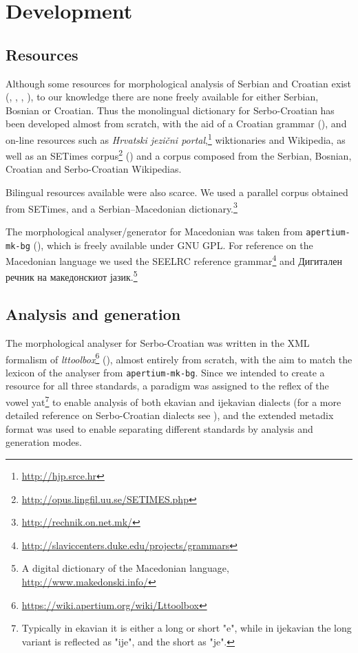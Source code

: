 \documentclass{book}
\begin{document}
\section{Development}
\subsection*{Resources}
Although some resources for morphological analysis of Serbian and Croatian exist
(\citealp{vitas2004intex}, \citealp{vitas2003processing}, \citealp{agic2008improving}, \citealp{snajder08automatic}), 
to our knowledge there are none freely available for either Serbian, Bosnian or 
Croatian. Thus the monolingual dictionary for Serbo-Croatian has been developed 
almost from scratch, with the aid of a Croatian grammar (\citealp{baric1997hrvatska}), 
and on-line resources such as \emph{Hrvatski jezični portal},\footnote{\url{http://hjp.srce.hr}}
wiktionaries and Wikipedia, as well as an SETimes corpus\footnote{\url{http://opus.lingfil.uu.se/SETIMES.php}} (\citealp{tyers2010south}) and a 
corpus composed from the Serbian, Bosnian, Croatian and Serbo-Croatian Wikipedias.

Bilingual resources available were also scarce. We used a parallel corpus obtained from
SETimes, and a Serbian--Macedonian %
dictionary.\footnote{\url{http://rechnik.on.net.mk/}}

The morphological analyser/generator for Macedonian was taken from
{\small{\tt apertium-mk-bg}} (\citealp{rangelov2011rule}), which is freely available under GNU GPL.
For reference on the Macedonian language we used the SEELRC reference grammar\footnote{\url{http://slaviccenters.duke.edu/projects/grammars}} and
Дигитален речник на македонскиот јазик.\footnote{A digital dictionary of the Macedonian language, \url{http://www.makedonski.info/}}

\subsection*{Analysis and generation}
The morphological analyser for Serbo-Croatian was written in the XML formalism of
\emph{lttoolbox}\footnote{\url{https://wiki.apertium.org/wiki/Lttoolbox}} (\citealp{rojas2005construccion}), almost entirely from scratch, with the
aim to match the lexicon of the analyser from {\small{\tt apertium-mk-bg}}. Since we intended to create a resource for all three
standards, a paradigm was assigned
to the reflex of the vowel yat\footnote{Typically in ekavian it is either a long or short "e", while in ijekavian the long variant is reflected as "ije", and the short as "je".} to enable analysis of both ekavian and ijekavian dialects (for a more detailed reference on Serbo-Croatian dialects see \citealp{brown2004handbook}), and the extended metadix format was used to enable separating different standards by
analysis and generation modes.
\end{document}
